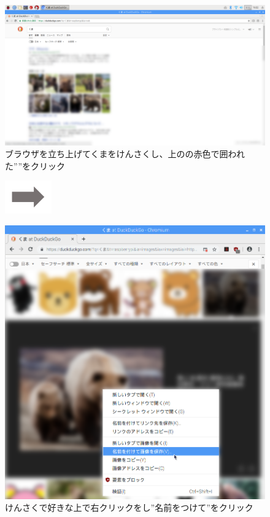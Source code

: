\begin{figure}[t]
  \begin{minipage}{0.4\textwidth}
    \includegraphics[width=\linewidth]{text01-img/textbook-img096.png}
     ブラウザを立ち上げてくまをけんさくし、上のの赤色で囲われた””をクリック
  \end{minipage}
  \includegraphics[width=2cm]{text01-img/textbook-img073.png}
  \begin{minipage}{0.4\textwidth}
    \includegraphics[width=\linewidth]{text01-img/textbook-img095.png}
     けんさくで好きな上で右クリックをし”名前をつけて”をクリック
  \end{minipage}

\end{figure}

